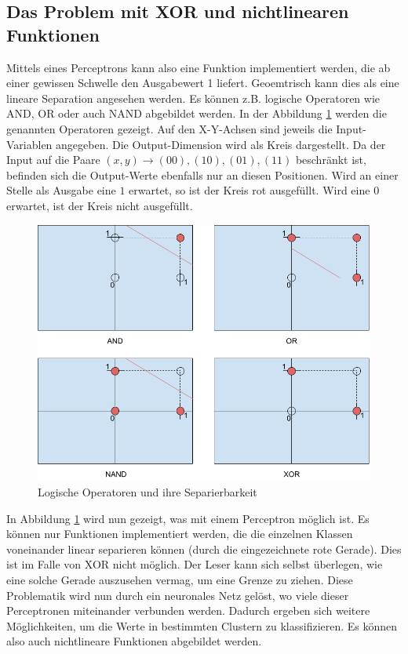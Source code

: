 \subsection{Das Problem mit XOR und nichtlinearen Funktionen}
Mittels eines Perceptrons kann also eine Funktion implementiert werden, die ab einer gewissen Schwelle den
Ausgabewert 1 liefert. Geoemtrisch kann dies als eine lineare Separation angesehen werden. Es können z.B. logische
Operatoren wie \glqq AND\grqq{}, \glqq OR\grqq{} oder auch \glqq NAND\grqq{} abgebildet werden.
In der Abbildung \ref{fig:06_logische_operatoren_1} werden die genannten Operatoren gezeigt. Auf den X-Y-Achsen
sind jeweils die Input-Variablen angegeben. Die Output-Dimension wird als Kreis dargestellt. Da der Input auf die Paare
$(x, y) \longrightarrow (0 0), (1 0), (0 1), (1 1)$ beschränkt ist, befinden sich die Output-Werte ebenfalls nur an diesen
Positionen. Wird an einer Stelle als Ausgabe eine $1$ erwartet, so ist der Kreis rot ausgefüllt. Wird eine $0$ erwartet,
ist der Kreis nicht ausgefüllt.
\begin{figure}[h!]
    \begin{center}
        \includegraphics[width=0.6\linewidth]{../common/01_neuronal_network/00_resources/01_logische_operatoren.png}
    \end{center}
    \caption{Logische Operatoren und ihre Separierbarkeit}
    \label{fig:06_logische_operatoren_1}
\end{figure}
In Abbildung \ref{fig:06_logische_operatoren_1} wird nun gezeigt, was mit einem Perceptron möglich ist. Es können nur
Funktionen implementiert werden, die die einzelnen Klassen voneinander linear separieren können (durch die eingezeichnete
rote Gerade). Dies ist im Falle von \glqq XOR\grqq{} nicht möglich. Der Leser kann sich selbst überlegen, wie eine solche
Gerade auszusehen vermag, um eine Grenze zu ziehen. Diese Problematik wird nun durch ein neuronales Netz gelöst, wo
viele dieser Perceptronen miteinander verbunden werden. Dadurch ergeben sich weitere Möglichkeiten, um die Werte in
bestimmten Clustern zu klassifizieren. Es können also auch nichtlineare Funktionen abgebildet werden.